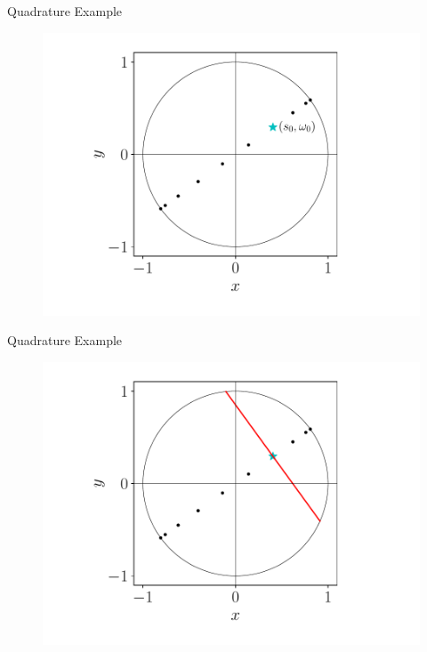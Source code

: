 \documentclass{beamer}
\begin{document}
\begin{frame}{Quadrature Example}
	\begin{figure}[H]
		\centering
		\includegraphics[scale=0.65]{figures/quad_2.pdf}
	\end{figure}
\end{frame}

\begin{frame}{Quadrature Example}
	\begin{figure}[H]
		\centering
		\includegraphics[scale=0.65]{figures/quad_3.pdf}
	\end{figure}
\end{frame}
\end{document}
